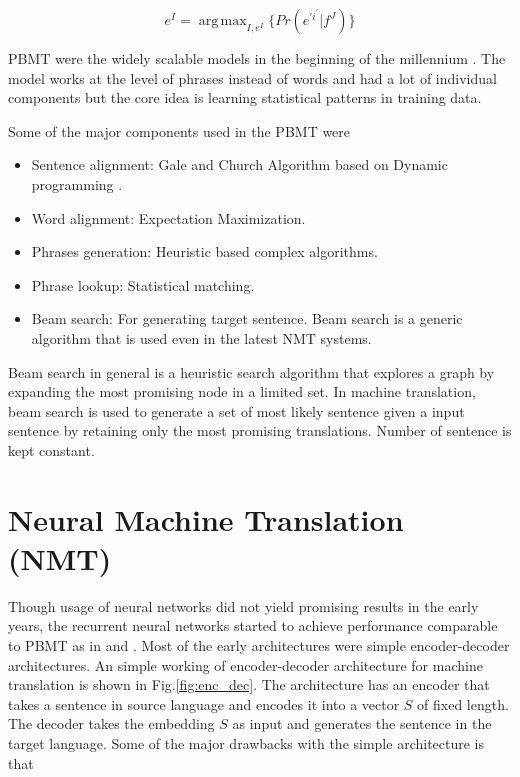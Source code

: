 \documentclass[a4paper]{article}
\DeclareMathOperator*{\argmax}{arg\,max}
\begin{document}
\begin{equation*}
  e^{I} = \argmax_{I,e^{I}} \Bigg\{Pr(e^{\prime i^\prime} | f^J) \Bigg\}
\end{equation*}


PBMT were the widely  scalable  models  in  the
beginning of the millennium \cite{koehn2003statistical}. The model works  at the
level of phrases instead of words and had a lot of individual components but the
core idea is learning statistical patterns in training data.

Some of the major components used in the PBMT were


\begin{itemize}
  \item Sentence  alignment:   Gale   and  Church  Algorithm  based  on  Dynamic
        programming \cite{lewis1994sequential}.
  \item Word alignment: Expectation Maximization.
  \item Phrases generation: Heuristic based complex algorithms.
  \item Phrase lookup: Statistical matching.
  \item Beam search:  For generating target sentence.  Beam search is a generic
        algorithm that is used even in the latest NMT systems.
\end{itemize}


Beam search in general is a heuristic search  algorithm that explores a graph by
expanding the most promising node in a limited set. In machine translation, beam
search is used to generate  a set of most likely sentence given a input sentence
by retaining  only the most promising  translations. Number of sentence  is kept
constant.


\section{Neural Machine Translation (NMT)}
Though usage of  neural networks did  not  yield  promising results in the early
years, the recurrent neural networks started to  achieve  performance comparable
to       PBMT       as       in       \cite{kalchbrenner2013recurrent}       and
\cite{hermann2013multilingual}. Most  of  the  early architectures  were  simple
encoder-decoder architectures. An simple working of encoder-decoder architecture
for machine translation is shown in Fig.\ref{fig:enc_dec}. The architecture has
an encoder that takes a sentence in source language and encodes it into a vector
$S$ of fixed length. The decoder takes the embedding $S$ as  input and generates
the sentence in the target language. Some of the major drawbacks with the simple
architecture is that
\end{document}
